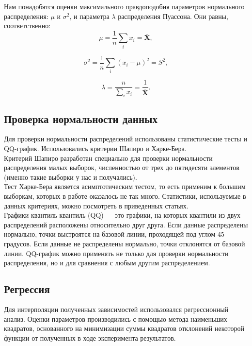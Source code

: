 Нам понадобятся оценки максимального правдоподобия параметров нормального распределения: $\mu$ и $\sigma^2$, и параметра $\lambda$ распределения Пуассона. Они равны, соответственно:
\begin{equation}
\mu = \frac{1}{n}\sum_i x_i = \mathbf{\bar{X}},
\end{equation}

\begin{equation}
\sigma^2 =  \frac{1}{n}\sum_i (x_i-\mu)^2 = S^2,
\end{equation}

\begin{equation}
\lambda = \frac{n}{\sum_i x_i} = \frac{1}{\mathbf{\bar{X}}}.
\end{equation}

\subsection{Проверка нормальности данных}
Для проверки нормальности распределений использованы статистические тесты и QQ-график. Использовались критерии Шапиро и Харке-Бера.\\

Критерий Шапиро разработан специально для проверки нормальности распределения малых выборок, численностью от трех до пятидесяти элементов \cite{shapiro} (именно такие выборки у нас и получались).\\

Тест Харке-Бера \cite{jarqueber} является асимптотическим тестом, то есть применим к большим выборкам, которых в работе оказалось не так много. Статистики, используемые в данных критериях, можно посмотреть в приведенных статьях.\\

Графики квантиль-квантиль (QQ) — это графики, на которых квантили из двух распределений расположены относительно друг друга. Если данные распределены нормально, точки выстроятся на базовой линии, проходящей под углом 45 градусов. Если данные не распределены нормально, точки отклонятся от базовой линии. QQ-график можно применять не только для проверки нормальности распределения, но и для сравнения с любым другим распределением.

\subsection{Регрессия}
Для интерполяции полученных зависимостей использовался регрессионный анализ. Оценки параметров производились с помощью метода наименьших квадратов, основанного на минимизации суммы квадратов отклонений некоторой функции от полученных в ходе эксперимента результатов.


